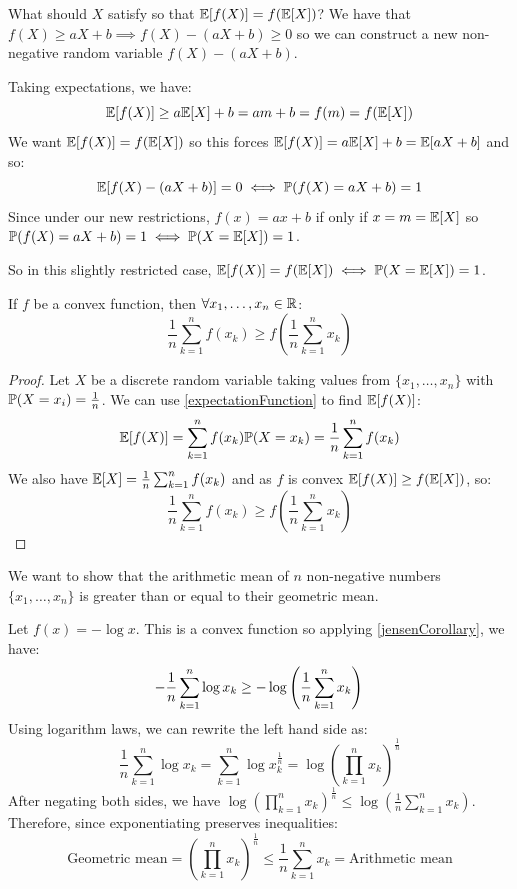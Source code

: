 \documentclass[../main.tex]{subfiles}
\begin{document}
What should $X$ satisfy so that $\E[f(X)] = f(\E[X])$?
We have that $f(X) \geq aX + b \implies f(X) - (aX + b) \geq 0$ so we can construct a new non-negative random variable $f(X) - (aX + b)$.

Taking expectations, we have:
\[
  \E[f(X)] \geq a \E[X] + b = am + b = f(m) = f(\E[X])
\]
We want $\E[f(X)] = f(\E[X])$ so this forces $\E[f(X)] = a \E[X] + b = \E[aX + b]$ and so:
\[
  \E[f(X) - (aX + b)] = 0 \iff \P(f(X) = aX + b) = 1
\]
Since under our new restrictions, $f(x) = ax + b$ if only if $x = m = \E[X]$ so $\P(f(X) = aX + b) = 1 \iff \P(X = \E[X]) = 1$.

So in this slightly restricted case, $\E[f(X)] = f(\E[X]) \iff \P(X = \E[X]) = 1$.
\begin{corollary}
  If $f$ be a convex function, then $\forall x_1, \ldots, x_n \in \R$:
  \label{jensenCorollary}
  \[
    \frac{1}{n} \sum_{k = 1}^{n} f(x_k) \geq f\left(\frac{1}{n}\sum_{k = 1}^{n} x_k\right)
  \]
\end{corollary}
\begin{proof}
  Let $X$ be a discrete random variable taking values from $\{x_1, \ldots, x_n\}$ with $\P(X = x_i) = \frac{1}{n}$.
  We can use \cref{expectationFunction} to find $\E[f(X)]$:
  \[
    \E[f(X)] = \sum_{k = 1}^{n} f(x_k)\P(X = x_k) = \frac{1}{n}\sum_{k = 1}^{n} f(x_k)
  \]
  We also have $\E[X] = \frac{1}{n}\sum_{k = 1}^{n} f(x_k)$ and as $f$ is convex $\E[f(X)] \geq f(\E[X])$, so:
  \[
    \frac{1}{n} \sum_{k = 1}^{n} f(x_k) \geq f\left(\frac{1}{n}\sum_{k = 1}^{n} x_k\right)
  \]
\end{proof}
\begin{example}[AM-GM Inequality]
  We want to show that the arithmetic mean of $n$ non-negative numbers $\{x_1, \ldots, x_n\}$ is greater than or equal to their geometric mean.

  Let $f(x) = -\log x$.
  This is a convex function so applying \cref{jensenCorollary}, we have:
  \[
    -\frac{1}{n} \sum_{k = 1}^{n} \log x_k \geq - \log\left(\frac{1}{n} \sum_{k = 1}^{n} x_k\right) \\
  \]
  Using logarithm laws, we can rewrite the left hand side as:
  \[
    \frac{1}{n} \sum_{k = 1}^{n} \log x_k = \sum_{k = 1}^{n} \log x^{\frac{1}{n}}_{k} = \log \left(\prod_{k = 1}^{n} x_k\right)^{\frac{1}{n}}
  \]
  After negating both sides, we have $\log \left(\prod_{k = 1}^{n} x_k\right)^{\frac{1}{n}} \leq \log\left(\frac{1}{n} \sum_{k = 1}^{n} x_k\right)$.
  Therefore, since exponentiating preserves inequalities:
  \[
    \text{Geometric mean} = \left(\prod_{k = 1}^{n} x_k\right)^{\frac{1}{n}} \leq \frac{1}{n} \sum_{k = 1}^{n} x_k = \text{Arithmetic mean}
  \]
\end{example}
\end{document}
